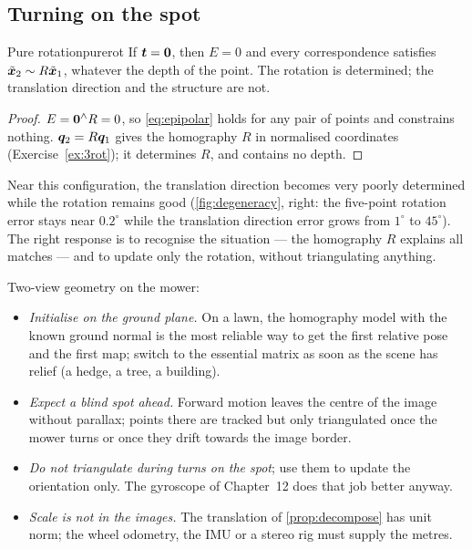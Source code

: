 \subsection{Turning on the spot}

\begin{proposition}{Pure rotation}{purerot}
If $\bm{t}=\bm{0}$, then $E=0$ and every correspondence satisfies
$\tilde{\bm{x}}_2\sim R\tilde{\bm{x}}_1$, whatever the depth of the
point. The rotation is determined; the translation direction and the
structure are not.
\end{proposition}

\begin{proof}
$E=\bm{0}^{\wedge}R=0$, so \eqref{eq:epipolar} holds for any pair of
points and constrains nothing. $\bm{q}_2=R\bm{q}_1$ gives the
homography $R$ in normalised coordinates (Exercise~\ref{ex:3rot}); it
determines $R$, and contains no depth.
\end{proof}

Near this configuration, the translation direction becomes very poorly
determined while the rotation remains good (\cref{fig:degeneracy},
right: the five-point rotation error stays near $0.2^\circ$ while the
translation direction error grows from $1^\circ$ to $45^\circ$). The
right response is to recognise the situation --- the homography $R$
explains all matches --- and to update only the rotation, without
triangulating anything.

\begin{mower}
Two-view geometry on the mower:
\begin{itemize}[nosep]
\item \emph{Initialise on the ground plane.} On a lawn, the homography
  model with the known ground normal is the most reliable way to get the
  first relative pose and the first map; switch to the essential matrix
  as soon as the scene has relief (a hedge, a tree, a building).
\item \emph{Expect a blind spot ahead.} Forward motion leaves the centre
  of the image without parallax; points there are tracked but only
  triangulated once the mower turns or once they drift towards the image
  border.
\item \emph{Do not triangulate during turns on the spot}; use them to
  update the orientation only. The gyroscope of Chapter~12 does that job
  better anyway.
\item \emph{Scale is not in the images.} The translation of
  \cref{prop:decompose} has unit norm; the wheel odometry, the IMU or a
  stereo rig must supply the metres.
\end{itemize}
\end{mower}

